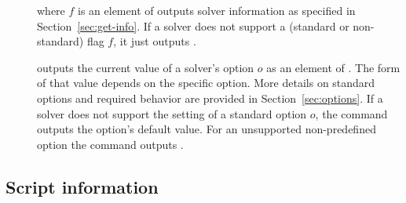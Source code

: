 \begin{description}

%
\item[] where $f$ is an element of 
outputs solver information as specified in Section~\ref{sec:get-info}.
If a solver does not support a (standard or non-standard) flag $f$,
it just outputs . 
\smallskip

%
\item[] 
outputs the current value of a solver's option $o$
as an element of .
The form of that value depends on the specific option.
More details on standard options and required behavior are provided 
in Section~\ref{sec:options}.  
If a solver does not support the setting of a standard option $o$,
the command outputs the option's default value.
For an unsupported non-predefined option the command outputs .  
\end{description}


\subsection{Script information} \label{sec:script-info}

